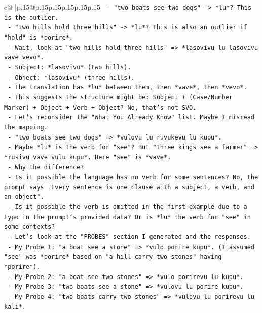 \documentclass{article}
\begin{document}
{\begin{supertabular}{c@{$\;$}|p{.15\linewidth}@{}p{.15\linewidth}p{.15\linewidth}p{.15\linewidth}p{.15\linewidth}p{.15\linewidth}}
{{{\texttt{     {-} "two boats see two dogs" {-}> *lu*? This is the outlier.} \\
\texttt{     {-} "two hills hold three hills" {-}> *lu*? This is also an outlier if "hold" is *porire*.} \\
\texttt{     {-} Wait, look at "two hills hold three hills" => *lasovivu lu lasovivu vave vevo*.} \\
\texttt{       {-} Subject: *lasovivu* (two hills).} \\
\texttt{       {-} Object: *lasovivu* (three hills).} \\
\texttt{       {-} The translation has *lu* between them, then *vave*, then *vevo*.} \\
\texttt{       {-} This suggests the structure might be: Subject + (Case/Number Marker) + Object + Verb + Object? No, that's not SVO.} \\
\texttt{       {-} Let's reconsider the "What You Already Know" list. Maybe I misread the mapping.} \\
\texttt{       {-} "two boats see two dogs" => *vulovu lu ruvukevu lu kupu*.} \\
\texttt{         {-} Maybe *lu* is the verb for "see"? But "three kings see a farmer" => *rusivu vave vulu kupu*. Here "see" is *vave*.} \\
\texttt{         {-} Why the difference?} \\
\texttt{         {-} Is it possible the language has no verb for some sentences? No, the prompt says "Every sentence is one clause with a subject, a verb, and an object".} \\
\texttt{         {-} Is it possible the verb is omitted in the first example due to a typo in the prompt's provided data? Or is *lu* the verb for "see" in some contexts?} \\
\texttt{         {-} Let's look at the "PROBES" section I generated and the responses.} \\
\texttt{           {-} My Probe 1: "a boat see a stone" => *vulo porire kupu*. (I assumed "see" was *porire* based on "a hill carry two stones" having *porire*).} \\
\texttt{           {-} My Probe 2: "a boat see two stones" => *vulo porirevu lu kupu*.} \\
\texttt{           {-} My Probe 3: "two boats see a stone" => *vulovu lu porire kupu*.} \\
\texttt{           {-} My Probe 4: "two boats carry two stones" => *vulovu lu porirevu lu kali*.} \\
}}}
\end{supertabular}}
\end{document}
